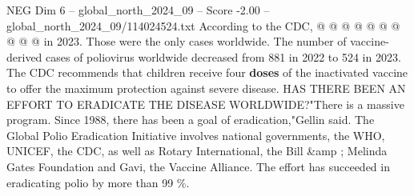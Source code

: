 \begin{textsample}{NEG Dim 6 – global\_north\_2024\_09 – Score -2.00 – global\_north\_2024\_09/114024524.txt}
According to the CDC, @ @ @ @ @ @ @ @ @ @ in 2023.
Those were the only cases worldwide.
The number of vaccine-derived cases of poliovirus worldwide decreased from 881 in 2022 to 524 in 2023.
The CDC recommends that children receive four \textbf{doses} of the inactivated vaccine to offer the maximum protection against severe disease.
HAS THERE BEEN AN EFFORT TO ERADICATE THE DISEASE WORLDWIDE?"There is a massive program.
Since 1988, there has been a goal of eradication,"Gellin said.
The Global Polio Eradication Initiative involves national governments, the WHO, UNICEF, the CDC, as well as Rotary International, the Bill \&amp ; Melinda Gates Foundation and Gavi, the Vaccine Alliance.
The effort has succeeded in eradicating polio by more than 99 \%.

\end{textsample}
